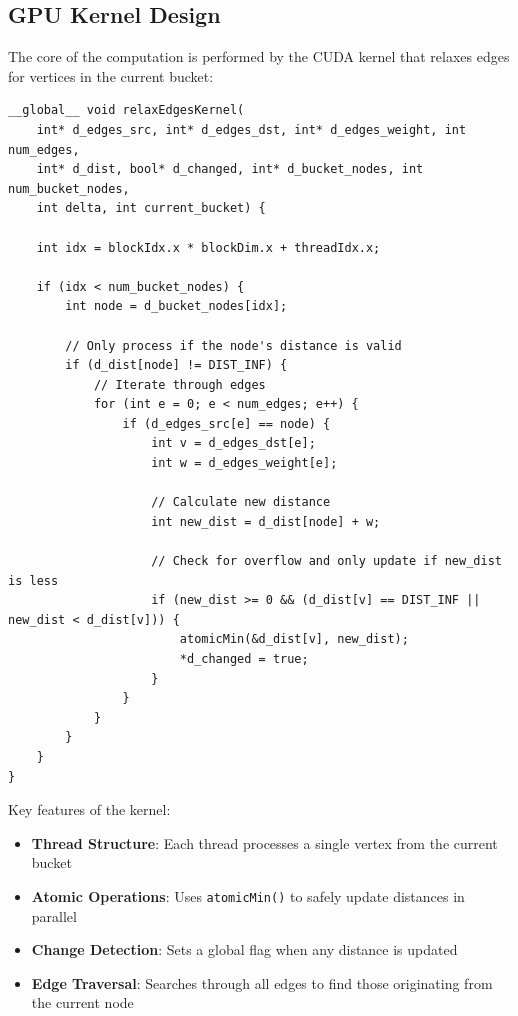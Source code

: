 \documentclass{article}
\begin{document}
\subsection*{GPU Kernel Design}

The core of the computation is performed by the CUDA kernel that relaxes edges for vertices in the current bucket:

\begin{verbatim}
__global__ void relaxEdgesKernel(
    int* d_edges_src, int* d_edges_dst, int* d_edges_weight, int num_edges,
    int* d_dist, bool* d_changed, int* d_bucket_nodes, int num_bucket_nodes,
    int delta, int current_bucket) {
    
    int idx = blockIdx.x * blockDim.x + threadIdx.x;
    
    if (idx < num_bucket_nodes) {
        int node = d_bucket_nodes[idx];
        
        // Only process if the node's distance is valid
        if (d_dist[node] != DIST_INF) {
            // Iterate through edges
            for (int e = 0; e < num_edges; e++) {
                if (d_edges_src[e] == node) {
                    int v = d_edges_dst[e];
                    int w = d_edges_weight[e];
                    
                    // Calculate new distance
                    int new_dist = d_dist[node] + w;
                    
                    // Check for overflow and only update if new_dist is less
                    if (new_dist >= 0 && (d_dist[v] == DIST_INF || new_dist < d_dist[v])) {
                        atomicMin(&d_dist[v], new_dist);
                        *d_changed = true;
                    }
                }
            }
        }
    }
}
\end{verbatim}

Key features of the kernel:
\begin{itemize}
    \item \textbf{Thread Structure}: Each thread processes a single vertex from the current bucket
    \item \textbf{Atomic Operations}: Uses \texttt{atomicMin()} to safely update distances in parallel
    \item \textbf{Change Detection}: Sets a global flag when any distance is updated
    \item \textbf{Edge Traversal}: Searches through all edges to find those originating from the current node
\end{itemize}
\end{document}
